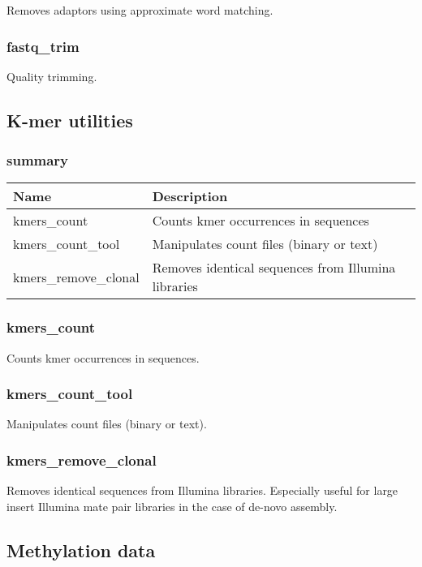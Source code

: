 \documentclass[a4paper,12pt]{article}
\begin{document}
Removes adaptors using approximate word matching.

\subsubsection{fastq\_trim}

Quality trimming.

\subsection{K-mer utilities}

\subsubsection{summary}

\begin{tabularx}{\textwidth}{|X|X|}
    \hline
    \textbf{Name}                   & \textbf{Description} \\
    \hline
    \hline
    kmers\_count                    & Counts kmer occurrences in sequences \\
    kmers\_count\_tool              & Manipulates count files (binary or text) \\
    kmers\_remove\_clonal           & Removes identical sequences from Illumina libraries \\
    \hline
\end{tabularx}

\subsubsection{kmers\_count}

Counts kmer occurrences in sequences.

\subsubsection{kmers\_count\_tool}

Manipulates count files (binary or text).

\subsubsection{kmers\_remove\_clonal}

Removes identical sequences from Illumina libraries.
Especially useful for large insert Illumina mate pair libraries in the case of
de-novo assembly.

\subsection{Methylation data}
\end{document}
